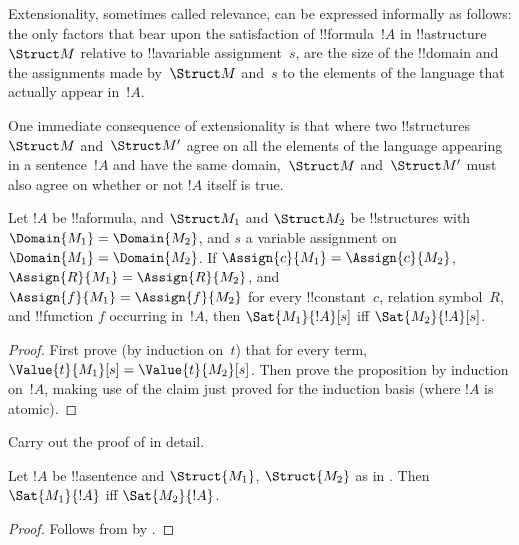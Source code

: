 \documentclass[../../../include/open-logic-section]{subfiles}
\begin{document}


\begin{explain}
Extensionality, sometimes called relevance, can be expressed
informally as follows: the only factors that bear upon the
satisfaction of !!{formula}~$!A$ in !!a{structure}~$\Struct M$
relative to !!a{variable} assignment~$s$, are the size of the
!!{domain} and the assignments made by~$\Struct M$ and~$s$ to the
elements of the language that actually appear in~$!A$.

One immediate consequence of extensionality is that where two
!!{structure}s~$\Struct M$ and~$\Struct M'$ agree on all the elements
of the language appearing in a sentence~$!A$ and have the same
domain,~$\Struct M$ and~$\Struct M'$ must also agree on whether or not
$!A$ itself is true.
\end{explain}

\begin{prop}[Extensionality]
  Let $!A$ be !!a{formula}, and $\Struct M_1$ and $\Struct M_2$ be
  !!{structure}s with $\Domain{M_1} = \Domain{M_2}$, and $s$ a
  variable assignment on $\Domain{M_1} = \Domain{M_2}$.  If
  $\Assign{c}{M_1} = \Assign{c}{M_2}$, $\Assign{R}{M_1}=\Assign{R}{M_2}$,
  and $\Assign{f}{M_1} = \Assign{f}{M_2}$ for every !!{constant}~$c$,
  relation symbol~$R$, and !!{function} $f$ occurring in~$!A$, then
  $\Sat{M_1}{!A}[s]$ iff $\Sat{M_2}{!A}[s]$.
\end{prop}

\begin{proof}
  First prove (by induction on~$t$) that for every term,
  $\Value{t}{M_1}[s] = \Value{t}{M_2}[s]$.  Then prove the proposition
  by induction on~$!A$, making use of the claim just proved for the
  induction basis (where $!A$ is atomic).
\end{proof}

\begin{prob}
Carry out the proof of  in
detail.
\end{prob}

\begin{cor}
  Let $!A$ be !!a{sentence} and $\Struct{M_1}$, $\Struct{M_2}$ as in
  . Then $\Sat{M_1}{!A}$ iff $\Sat{M_2}{!A}$.
\end{cor}

\begin{proof}
Follows from  by .
\end{proof}
\end{document}
